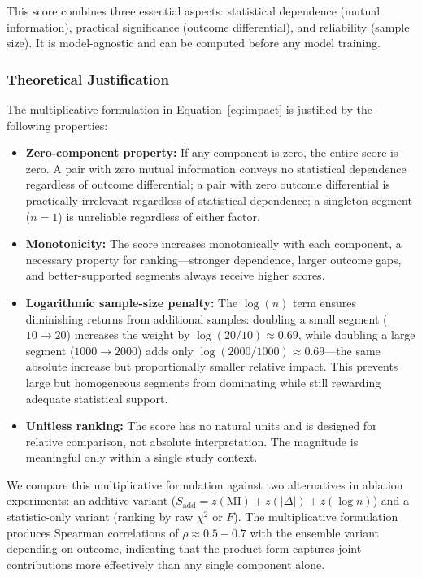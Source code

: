 \documentclass[twocolumn]{article}
\begin{document}
This score combines three essential aspects: statistical dependence (mutual information), practical significance (outcome differential), and reliability (sample size). It is model-agnostic and can be computed before any model training.

\subsubsection{Theoretical Justification}

The multiplicative formulation in Equation~\ref{eq:impact} is justified by the following properties:

\begin{itemize}
    \item \textbf{Zero-component property:} If any component is zero, the entire score is zero. A pair with zero mutual information conveys no statistical dependence regardless of outcome differential; a pair with zero outcome differential is practically irrelevant regardless of statistical dependence; a singleton segment ($n=1$) is unreliable regardless of either factor.
    \item \textbf{Monotonicity:} The score increases monotonically with each component, a necessary property for ranking---stronger dependence, larger outcome gaps, and better-supported segments always receive higher scores.
    \item \textbf{Logarithmic sample-size penalty:} The $\log(n)$ term ensures diminishing returns from additional samples: doubling a small segment ($10\to20$) increases the weight by $\log(20/10) \approx 0.69$, while doubling a large segment ($1000\to2000$) adds only $\log(2000/1000) \approx 0.69$---the same absolute increase but proportionally smaller relative impact. This prevents large but homogeneous segments from dominating while still rewarding adequate statistical support.
    \item \textbf{Unitless ranking:} The score has no natural units and is designed for relative comparison, not absolute interpretation. The magnitude is meaningful only within a single study context.
\end{itemize}

We compare this multiplicative formulation against two alternatives in ablation experiments: an additive variant ($S_{\text{add}} = z(\text{MI}) + z(|\Delta|) + z(\log n)$) and a statistic-only variant (ranking by raw $\chi^2$ or $F$). The multiplicative formulation produces Spearman correlations of $\rho \approx 0.5-0.7$ with the ensemble variant depending on outcome, indicating that the product form captures joint contributions more effectively than any single component alone.
\end{document}
